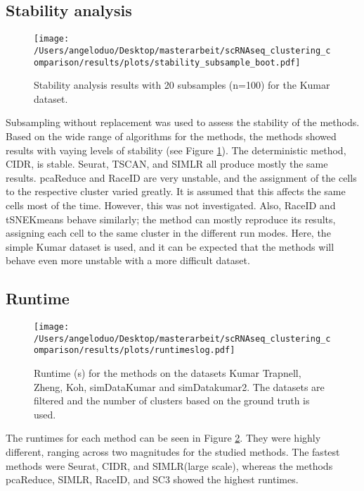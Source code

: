 \documentclass[11pt, a4paper]{article}\usepackage[]{graphicx}\usepackage[]{color}
\begin{document}
\subsection{Stability  analysis}
\begin{figure}[!h]
\texttt{[image: /Users/angeloduo/Desktop/masterarbeit/scRNAseq\_clustering\_comparison/results/plots/stability\_subsample\_boot.pdf]}
\caption{Stability analysis results with 20 subsamples (n=100) for the Kumar dataset.}
\label{fig:stab}
\end{figure}

Subsampling without replacement was used to assess the stability of the methods. Based on the wide range of algorithms for the methods, the methods showed results with vaying levels of stability (see Figure \ref{fig:stab}). The deterministic method, CIDR, is stable. Seurat, TSCAN, and SIMLR all produce mostly the same results. pcaReduce and RaceID are very unstable, and the assignment of the cells to the respective cluster varied greatly. It is assumed that this affects the same cells most of the time. However, this was not investigated. Also, RaceID and tSNEKmeans behave similarly; the method can mostly reproduce its results, assigning each cell to the same cluster in the different run modes. Here, the simple Kumar dataset is used, and it can be expected that the methods will behave even more unstable with a more difficult dataset.  
\newpage

\subsection{Runtime} 

\begin{figure}[htp]
\begin{center}
\texttt{[image: /Users/angeloduo/Desktop/masterarbeit/scRNAseq\_clustering\_comparison/results/plots/runtimeslog.pdf]}
\caption{Runtime (s) for the methods on the datasets Kumar Trapnell, Zheng, Koh, simDataKumar and simDatakumar2. The datasets are filtered and the number of clusters based on the ground truth is used.}
\label{fig:runtimelog}
\end{center}
\end{figure}

The runtimes for each method can be seen in Figure \ref{fig:runtimelog}. They were highly different, ranging across two magnitudes for the studied methods. The fastest methods were Seurat, CIDR, and SIMLR(large scale), whereas the methods pcaReduce, SIMLR, RaceID, and SC3 showed the highest runtimes. 
\end{document}
